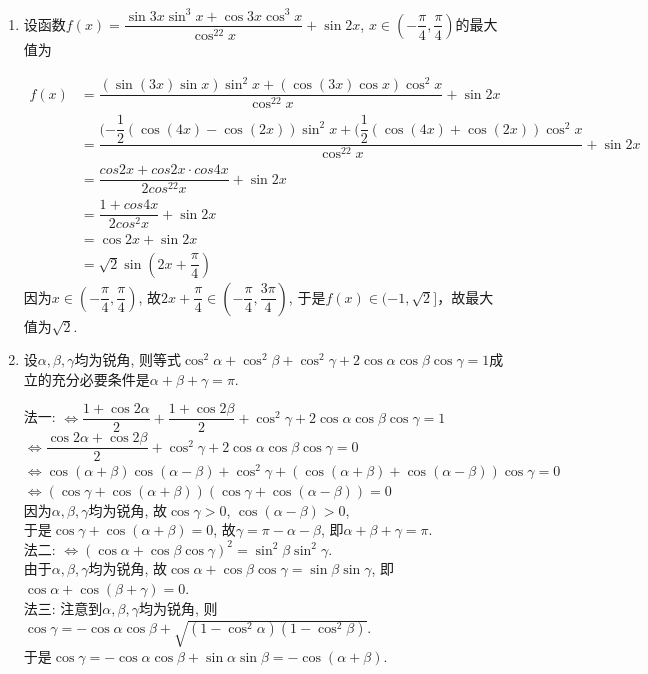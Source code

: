\begin{enumerate}

\item 设函数$f(x)=\dfrac{\sin3x\sin^3x+\cos3x\cos^3x}{\cos^22x}+\sin2x$, $x\in\left(-\dfrac{\pi}{4},\dfrac{\pi}{4}\right)$的最大值为
\begin{jieda}
\begin{align*}
f(x)
& = \dfrac{(\sin(3x)\sin x)\sin^2x+(\cos(3x)\cos x)\cos^2x}{\cos^22x}+\sin2x \\
& = \dfrac{(-\dfrac{1}{2}(\cos(4x)-\cos(2x))\sin^2x+(\dfrac{1}{2}(\cos(4x)+\cos(2x))\cos^2x}{\cos^22x}+\sin2x \\
& = \dfrac{cos2x+cos2x \cdot cos4x}{2cos^22x} +\sin2x \\
& = \dfrac{1 + cos4x}{2cos^2x} +\sin2x \\
& = \cos2x+\sin2x\\
& = \sqrt{2}\sin\left(2x+\dfrac{\pi}{4}\right)
\end{align*}
因为$x\in\left(-\dfrac{\pi}{4},\dfrac{\pi}{4}\right)$, 故$2x+\dfrac{\pi}{4}\in\left(-\dfrac{\pi}{4},\dfrac{3\pi}{4}\right)$, 
于是$f(x)\in(-1,\sqrt{2}]$，故最大值为$\sqrt{2}$.
\end{jieda}


\item 设$\alpha,\beta,\gamma$均为锐角, 则等式$\cos^2\alpha+\cos^2\beta+\cos^2\gamma+2\cos\alpha\cos\beta\cos\gamma=1$成立的充分必要条件是$\alpha+\beta+\gamma=\pi$. 

\begin{jieda}
法一: $\iff\dfrac{1+\cos2\alpha}{2}+\dfrac{1+\cos2\beta}{2}+\cos^2\gamma+2\cos\alpha\cos\beta\cos\gamma=1$\\
$\iff\dfrac{\cos2\alpha+\cos2\beta}{2}+\cos^2\gamma+2\cos\alpha\cos\beta\cos\gamma=0$\\
$\iff\cos(\alpha+\beta)\cos(\alpha-\beta)+\cos^2\gamma+(\cos(\alpha+\beta)+\cos(\alpha-\beta))\cos\gamma=0$\\
$\iff(\cos\gamma+\cos(\alpha+\beta))(\cos\gamma+\cos(\alpha-\beta))=0$\\
因为$\alpha,\beta,\gamma$均为锐角, 故$\cos\gamma>0$, $\cos(\alpha-\beta)>0$, \\
于是$\cos\gamma+\cos(\alpha+\beta)=0$, 故$\gamma=\pi-\alpha-\beta$, 即$\alpha+\beta+\gamma=\pi$. \\
法二: $\iff(\cos\alpha+\cos\beta\cos\gamma)^2=\sin^2\beta\sin^2\gamma$. \\
由于$\alpha,\beta,\gamma$均为锐角, 故$\cos\alpha+\cos\beta\cos\gamma=\sin\beta\sin\gamma$, 即$\cos\alpha+\cos(\beta+\gamma)=0$. \\
法三: 注意到$\alpha,\beta,\gamma$均为锐角, 则$\cos\gamma=-\cos\alpha\cos\beta+\sqrt{(1-\cos^2\alpha)(1-\cos^2\beta)}$. \\
于是$\cos\gamma=-\cos\alpha\cos\beta+\sin\alpha\sin\beta=-\cos(\alpha+\beta)$. 
\end{jieda}



\end{enumerate}
